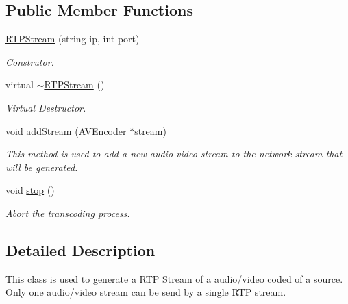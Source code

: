 \subsection*{Public Member Functions}
\begin{DoxyCompactItemize}
\item 
\hyperlink{classbr_1_1ufscar_1_1lince_1_1streaming_1_1RTPStream_a4fd180622cabd00d28e45cfb80e61284}{RTPStream} (string ip, int port)
\begin{DoxyCompactList}\small\item\em Construtor. \item\end{DoxyCompactList}\item 
virtual \hyperlink{classbr_1_1ufscar_1_1lince_1_1streaming_1_1RTPStream_a3d9df009764249b82871d234bd6573c7}{$\sim$RTPStream} ()
\begin{DoxyCompactList}\small\item\em Virtual Destructor. \item\end{DoxyCompactList}\item 
void \hyperlink{classbr_1_1ufscar_1_1lince_1_1streaming_1_1RTPStream_a5533a25709c548aada927315b845b4f3}{addStream} (\hyperlink{classbr_1_1ufscar_1_1lince_1_1streaming_1_1AVEncoder}{AVEncoder} $\ast$stream)
\begin{DoxyCompactList}\small\item\em This method is used to add a new audio-\/video stream to the network stream that will be generated. \item\end{DoxyCompactList}\item 
void \hyperlink{classbr_1_1ufscar_1_1lince_1_1streaming_1_1RTPStream_a2b4ccacba5f834f28d12c7709d0ec65d}{stop} ()
\begin{DoxyCompactList}\small\item\em Abort the transcoding process. \item\end{DoxyCompactList}\end{DoxyCompactItemize}


\subsection{Detailed Description}
This class is used to generate a RTP Stream of a audio/video coded of a source. Only one audio/video stream can be send by a single RTP stream. 

